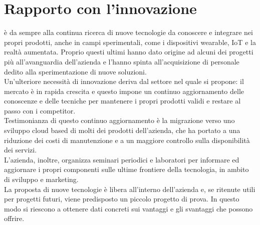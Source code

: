 \section{Rapporto con l'innovazione}
\nomeAzienda{} è da sempre alla continua ricerca di nuove tecnologie da conoscere e integrare nei propri prodotti, anche in campi sperimentali, come i dispositivi \gls{wearable}, \gls{IoT} e la realtà aumentata. Proprio questi ultimi hanno dato origine ad alcuni dei progetti più all'avanguardia dell'azienda e l'hanno spinta all'acquisizione di personale dedito alla sperimentazione di nuove soluzioni.
\\
Un'ulteriore necessità di innovazione deriva dal settore nel quale \nomeAzienda{} si propone: il mercato è in rapida crescita e questo impone un continuo aggiornamento delle conoscenze e delle tecniche per mantenere i propri prodotti validi e restare al passo con i competitor.
\\
Testimonianza di questo continuo aggiornamento è la migrazione verso uno sviluppo cloud based di molti dei prodotti dell'azienda, che ha portato a una riduzione dei costi di manutenzione e a un maggiore controllo sulla disponibilità dei servizi.
\\
L'azienda, inoltre, organizza seminari periodici e laboratori per informare ed aggiornare i propri componenti sulle ultime frontiere della tecnologia, in ambito di sviluppo e marketing.
\\
La proposta di nuove tecnologie è libera all'interno dell'azienda e, se ritenute utili per progetti futuri, viene predisposto un piccolo progetto di prova. In questo modo si riescono a ottenere dati concreti sui vantaggi e gli svantaggi che possono offrire.
